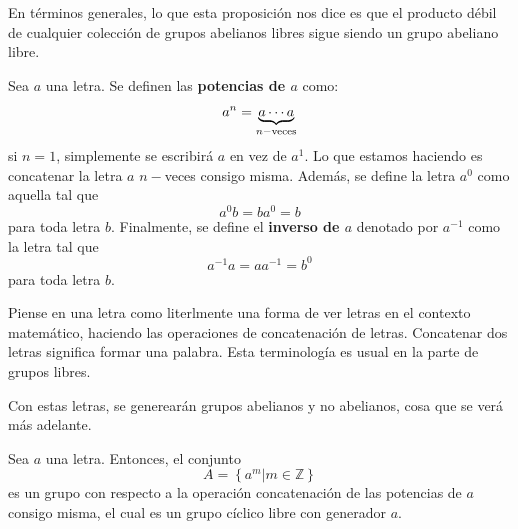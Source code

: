 \documentclass[12pt]{report}
\newcounter{it}
\theoremstyle{largebreak}
\begin{document}
    En términos generales, lo que esta proposición nos dice es que el producto débil de cualquier colección de grupos abelianos libres sigue siendo un grupo abeliano libre.

    \begin{mydef}
        Sea $a$ una letra. Se definen las \textbf{potencias de $a$} como:
        \begin{equation*}
            a^n=\underset{n-\textup{veces}}{\underbrace{a\cdots a}}
        \end{equation*}
        si $n=1$, simplemente se escribirá $a$ en vez de $a^1$. Lo que estamos haciendo es concatenar la letra $a$ $n-$veces consigo misma. Además, se define la letra $a^{0}$ como aquella tal que
        \begin{equation*}
            a^0b=ba^0=b
        \end{equation*}
        para toda letra $b$. Finalmente, se define el \textbf{inverso de $a$} denotado por $a^{-1}$ como la letra tal que
        \begin{equation*}
            a^{-1}a=aa^{-1}=b^{0}
        \end{equation*}
        para toda letra $b$.
    \end{mydef}

    \begin{obs}
        Piense en una letra como literlmente una forma de ver letras en el contexto matemático, haciendo las operaciones de concatenación de letras. Concatenar dos letras significa formar una palabra. Esta terminología es usual en la parte de grupos libres.

        Con estas letras, se generearán grupos abelianos y no abelianos, cosa que se verá más adelante.
    \end{obs}

    \begin{mydef}
        Sea $a$ una letra. Entonces, el conjunto
        \begin{equation*}
            A=\left\{a^m\Big|m\in\mathbb{Z} \right\}
        \end{equation*}
        es un grupo con respecto a la operación concatenación de las potencias de $a$ consigo misma, el cual es un grupo cíclico libre con generador $a$.
    \end{mydef}
\end{document}
